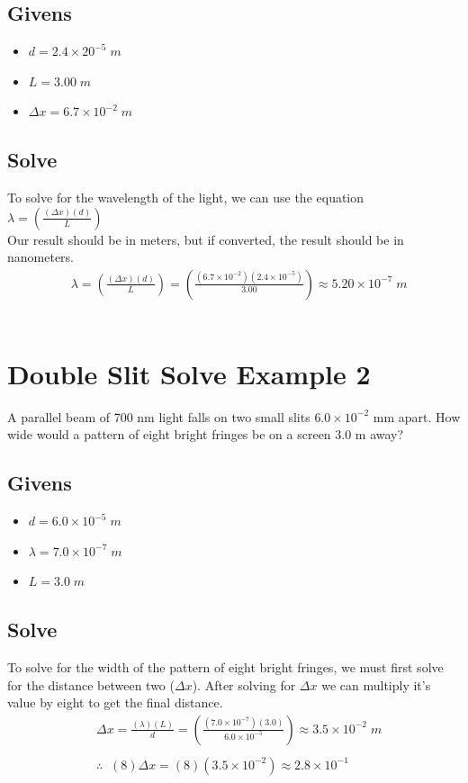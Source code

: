 \documentclass{article}
\begin{document}
\subsection*{Givens}
\begin{itemize}
    \item $d = 2.4 \times 20^{-5}\;m$
    \item $L = 3.00\;m $
    \item $\Delta x = 6.7 \times 10^{-2}\;m$
\end{itemize}\leavevmode
\subsection*{Solve}
To solve for the wavelength of the light, we can use the equation $\lambda = \left(\frac{(\Delta x)(d)}{L}\right)$\\ Our result should be in meters, but if converted, the result should be in nanometers.\\
\begin{align*}
     & \lambda = \left(\frac{(\Delta x)(d)}{L}\right)      = \left(\frac{(6.7 \times 10^{-2})(2.4 \times 10^{-5})}{3.00}\right) \approx 5.20 \times 10^{-7}\;m
\end{align*}\leavevmode\\


\section{Double Slit Solve Example 2}
A parallel beam of 700 nm light falls on two small slits $6.0 \times 10^{-2}$ mm apart. How wide would a pattern of eight bright fringes be on a screen 3.0 m away?
\subsection*{Givens}
\begin{itemize}
    \item $d = 6.0 \times 10^{-5}\;m$
    \item $\lambda = 7.0 \times 10^{-7}\;m$
    \item $L = 3.0\;m$
\end{itemize}\leavevmode
\subsection*{Solve}
To solve for the width of the pattern of eight bright fringes, we must first solve for the distance between two ($\Delta x$). After solving for $\Delta x$ we can multiply it's value by eight to get the final distance.\\
\begin{align*}
     & \Delta x = \frac{(\lambda)(L)}{d} = \left(\frac{(7.0 \times 10^{-7})(3.0)}{6.0 \times 10^{-5}}\right) \approx 3.5 \times 10^{-2}\;m \\\\
     & \therefore\;\;(8)\Delta x = (8)(3.5 \times 10^{-2}) \approx 2.8 \times 10^{-1}
\end{align*}\leavevmode\\
\end{document}
